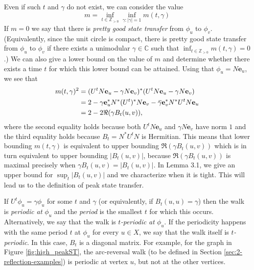 \documentclass{article}
\numberwithin{equation}{section}
\newcommand\comp[1]{{\mkern2mu\overline{\mkern-2mu#1}}}
\newcommand\cx{{\mathbb C}}%
\newcommand\ints{{\mathbb Z}}
\newcommand\Ze{{\mathbf e}}
\begin{document}
Even if such $t$ and $\gamma$ do not exist, we can consider the value
\[
m = \inf_{t \in \ints_{> 0}} \inf_{\gamma: |\gamma| = 1} m(t,\gamma)
\]
If $m = 0$ we say that there is \textsl{pretty good state transfer} from $\phi_u$ to $\phi_v$. (Equivalently, since the unit circle is compact, there is pretty good state transfer from $\phi_u$ to $\phi_v$ if there exists a unimodular $\gamma \in \cx$ such that $
\inf_{t \in \ints_{> 0 }} m(t,\gamma) = 0$.) We can also give a lower bound on the value of $m$ and determine whether there exists a time $t$ for which this lower bound can be attained. Using that $\phi_u = N\Ze_u$, we see that
\[
\begin{split}
m(t,\gamma)^2 &= (U^t N \Ze_u - \gamma N \Ze_v)^*(U^t N \Ze_u - \gamma N \Ze_v) \\
&= 2 - \gamma\Ze_u^*N^*(U^t)^*N\Ze_v - \comp{\gamma}\Ze_v^*N^*U^tN\Ze_u \\
&= 2 - 2\Re(\gamma B_t(u,v)),
\end{split}
\]
where the second equality holds because both $U^tN\Ze_u$ and $\gamma N\Ze_v$ have norm $1$ and the third equality holds because $B_t = N^*U^t N$ is Hermitian. This means that lower bounding $m(t,\gamma)$ is equivalent to upper bounding $\Re(\gamma B_t(u,v))$ which is in turn equivalent to upper bounding $|B_t(u,v)|$, because $\Re(\gamma B_t(u,v))$ is maximal precisely when $\gamma B_t(u,v) = |B_t(u,v)|$. In Lemma 3.1, we give an upper bound for $\sup_t|B_t(u,v)|$ and we characterize when it is tight. This will lead us to the definition of peak state transfer.

If $U^t\phi_u = \gamma\phi_u$ for some $t$ and $\gamma$ (or equivalently, if $B_t(u,u) = \gamma$) then the walk is \textsl{periodic at $\phi_u$} and the \textsl{period} is the smallest $t$ for which this occurs. Alternatively, we say that the walk is \textsl{$t$-periodic at $\phi_u$}. If the periodicity happens with the same period $t$ at $\phi_u$ for every $u \in X$, we say that the walk itself is \textsl{$t$-periodic}. In this case, $B_t$ is a diagonal matrix. For example, for the graph in Figure \ref{fig:high_peakST}, the arc-reversal walk (to be defined in Section \ref{sec:2-reflection-examples}) is periodic at vertex $u$, but not at the other vertices. 
\end{document}
